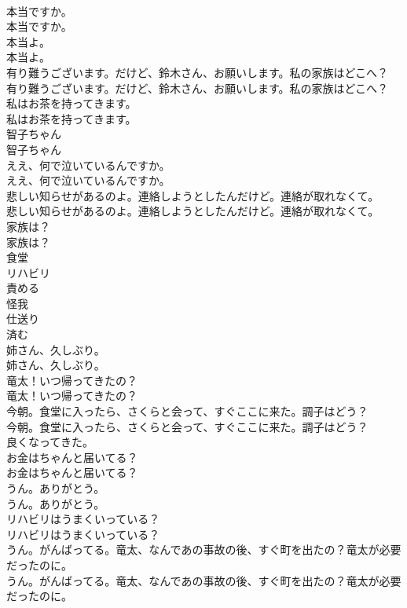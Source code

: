 \documentclass[8pt]{extreport}
\begin{document}
\begin{CJK}{UTF8}{min}
\\	本当ですか。	
\\	本当ですか。 
\\	本当よ。	
\\	本当よ。 
\\	有り難うございます。だけど、鈴木さん、お願いします。私の家族はどこへ？	
\\	有り難うございます。だけど、鈴木さん、お願いします。私の家族はどこへ？ 
\\	私はお茶を持ってきます。	
\\	私はお茶を持ってきます。 
\\	智子ちゃん	
\\	智子ちゃん 
\\	ええ、何で泣いているんですか。	
\\	ええ、何で泣いているんですか。 
\\	悲しい知らせがあるのよ。連絡しようとしたんだけど。連絡が取れなくて。	
\\	悲しい知らせがあるのよ。連絡しようとしたんだけど。連絡が取れなくて。 
\\	家族は？	
\\	家族は？ 
\\	食堂
\\	リハビリ
\\	責める
\\	怪我
\\	仕送り
\\	済む
\\	姉さん、久しぶり。	
\\	姉さん、久しぶり。 
\\	竜太！いつ帰ってきたの？	
\\	竜太！いつ帰ってきたの？ 
\\	今朝。食堂に入ったら、さくらと会って、すぐここに来た。調子はどう？	
\\	今朝。食堂に入ったら、さくらと会って、すぐここに来た。調子はどう？ 
\\	良くなってきた。 
\\	お金はちゃんと届いてる？	
\\	お金はちゃんと届いてる？ 
\\	うん。ありがとう。	
\\	うん。ありがとう。 
\\	リハビリはうまくいっている？	
\\	リハビリはうまくいっている？ 
\\	うん。がんばってる。竜太、なんであの事故の後、すぐ町を出たの？竜太が必要だったのに。	
\\	うん。がんばってる。竜太、なんであの事故の後、すぐ町を出たの？竜太が必要だったのに。 

\end{CJK}
\end{document}
